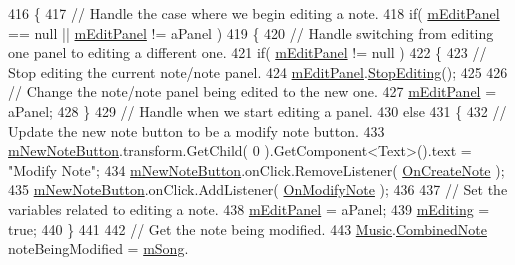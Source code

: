 \begin{DoxyCode}
416     \{
417         \textcolor{comment}{// Handle the case where we begin editing a note.}
418         \textcolor{keywordflow}{if}( \hyperlink{group___s_c_m_priv_var_gad063b650cf7112be19edaf1a2033ea4d}{mEditPanel} == null || \hyperlink{group___s_c_m_priv_var_gad063b650cf7112be19edaf1a2033ea4d}{mEditPanel} != aPanel )
419         \{
420             \textcolor{comment}{// Handle switching from editing one panel to editing a different one.}
421             \textcolor{keywordflow}{if}( \hyperlink{group___s_c_m_priv_var_gad063b650cf7112be19edaf1a2033ea4d}{mEditPanel} != null )
422             \{
423                 \textcolor{comment}{// Stop editing the current note/note panel.}
424                 \hyperlink{group___s_c_m_priv_var_gad063b650cf7112be19edaf1a2033ea4d}{mEditPanel}.\hyperlink{group___s_c___n_d_p_unity_ga92d0f078c4efd6c207173a10e31b5065}{StopEditing}();
425 
426                 \textcolor{comment}{// Change the note/note panel being edited to the new one.}
427                 \hyperlink{group___s_c_m_priv_var_gad063b650cf7112be19edaf1a2033ea4d}{mEditPanel} = aPanel;
428             \}
429             \textcolor{comment}{// Handle when we start editing a panel.}
430             \textcolor{keywordflow}{else}
431             \{
432                 \textcolor{comment}{// Update the new note button to be a modify note button.}
433                 \hyperlink{group___s_c_m_priv_var_gac17f83788e480bb97160d17bbe69aab3}{mNewNoteButton}.transform.GetChild( 0 ).GetComponent<Text>().text = \textcolor{stringliteral}{"Modify
       Note"};
434                 \hyperlink{group___s_c_m_priv_var_gac17f83788e480bb97160d17bbe69aab3}{mNewNoteButton}.onClick.RemoveListener( 
      \hyperlink{group___s_c_m_handlers_gaed512eb78e060a40616e6e31ce029440}{OnCreateNote} );
435                 \hyperlink{group___s_c_m_priv_var_gac17f83788e480bb97160d17bbe69aab3}{mNewNoteButton}.onClick.AddListener( \hyperlink{group___s_c_m_handlers_gaf12d6326ad2175a51f688504372be784}{OnModifyNote} );
436 
437                 \textcolor{comment}{// Set the variables related to editing a note.}
438                 \hyperlink{group___s_c_m_priv_var_gad063b650cf7112be19edaf1a2033ea4d}{mEditPanel} = aPanel;
439                 \hyperlink{group___s_c_m_priv_var_gad2a61787c63fb8770d3c8100adfae9cf}{mEditing} = \textcolor{keyword}{true};
440             \}
441 
442             \textcolor{comment}{// Get the note being modified.}
443             \hyperlink{class_music}{Music}.\hyperlink{group___music_structs_struct_music_1_1_combined_note}{CombinedNote} noteBeingModified = \hyperlink{group___s_c_m_priv_var_gabd8329149faef65a689650d951a9abc9}{mSong}.

\end{DoxyCode}
